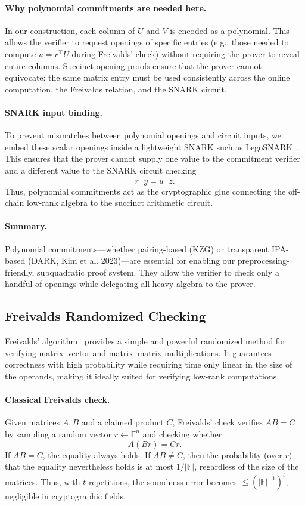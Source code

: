 \documentclass[11pt]{article}
\begin{document}
\paragraph{Why polynomial commitments are needed here.}
In our construction, each column of $U$ and $V$ is encoded as a polynomial.
This allows the verifier to request openings of specific entries
(e.g., those needed to compute $u = r^\top U$ during Freivalds' check)
without requiring the prover to reveal entire columns.
Succinct opening proofs ensure that the prover cannot equivocate:
the same matrix entry must be used consistently across the online
computation, the Freivalds relation, and the SNARK circuit.

\paragraph{SNARK input binding.}
To prevent mismatches between polynomial openings and circuit inputs,  
we embed these scalar openings inside a lightweight SNARK such as  
LegoSNARK~\cite{campanelli2019legosnark}.
This ensures that the prover cannot supply one value to the commitment
verifier and a different value to the SNARK circuit checking
\[
  r^\top y = u^\top z.
\]
Thus, polynomial commitments act as the cryptographic glue connecting
the off-chain low-rank algebra to the succinct arithmetic circuit.

\paragraph{Summary.}
Polynomial commitments---whether pairing-based (KZG) or transparent
IPA-based (DARK, Kim et al. 2023)---are essential for enabling
our preprocessing-friendly, subquadratic proof system.
They allow the verifier to check only a handful of openings while
delegating all heavy algebra to the prover.

\subsection{Freivalds Randomized Checking}

Freivalds' algorithm~\cite{freivalds1979fast} provides a simple and 
powerful randomized method for verifying matrix–vector and 
matrix–matrix multiplications.
It guarantees correctness with high probability while requiring 
time only linear in the size of the operands, making it ideally 
suited for verifying low-rank computations.

\paragraph{Classical Freivalds check.}
Given matrices $A, B$ and a claimed product $C$, Freivalds' check 
verifies $AB = C$ by sampling a random vector 
$r \leftarrow \mathbb{F}^n$ and checking whether
\[
  A (B r) = C r.
\]
If $AB = C$, the equality always holds.
If $AB \neq C$, then the probability (over $r$) that the equality 
nevertheless holds is at most $1/|\mathbb{F}|$, regardless of the size 
of the matrices.
Thus, with $t$ repetitions, the soundness error becomes $\leq 
(|\mathbb{F}|^{-1})^t$, negligible in cryptographic fields.
\end{document}
